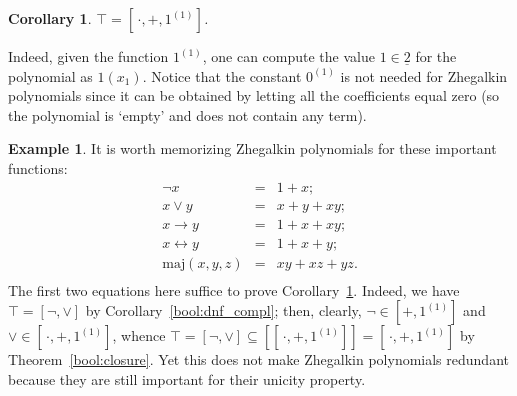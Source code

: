 \documentclass[12pt,notitlepage]{article}
\theoremstyle{plain}
\newtheorem{corr}[thm]{Corollary}
\theoremstyle{definition}
\newtheorem{exm}[thm]{Example}
\theoremstyle{plain}
\newcommand{\sbs}{\subseteq}
\newcommand{\ul}[1]{\underline{#1}}
\newcommand{\1}{\mathbf{1}}
\newcommand{\0}{\mathbf{0}}
\begin{document}
\begin{corr}\label{bool:poly_compl}
$\top = [\,{\cdot}, {+}, 1^{(1)}]$.
\end{corr}
Indeed, given the function $1^{(1)}$, one can compute the value $1 \in \ul{2}$ for the polynomial as $1(x_1)$. Notice that the constant $0^{(1)}$ is not needed for Zhegalkin polynomials since it can be obtained by letting all the coefficients equal zero (so the polynomial is `empty' and does not contain any term).
\begin{exm}
It is worth memorizing Zhegalkin polynomials for these important functions:
$$
\begin{array}{rcl}
\neg x &=& 1 + x;\\
x \vee y &=& x + y + xy;\\
x \to y &=& 1 + x + xy;\\
x \leftrightarrow y &=& 1 + x + y;\\
\mathrm{maj}(x, y, z) &=& xy + xz + yz.\\
\end{array}
$$
The first two equations here suffice to prove Corollary~\ref{bool:poly_compl}. Indeed, we have $\top = [{\neg}, {\vee}]$ by Corollary~\ref{bool:dnf_compl}; then, clearly, ${\neg} \in [{+}, 1^{(1)}]$ and ${\vee} \in [\,{\cdot}, {+}, 1^{(1)}]$, whence $\top = [{\neg}, {\vee}] \sbs [[\,{\cdot}, {+}, 1^{(1)}]] = [\,{\cdot}, {+}, 1^{(1)}]$ by Theorem~\ref{bool:closure}. Yet this does not make Zhegalkin polynomials redundant because they are still important for their unicity property. 
\end{exm}
\end{document}
